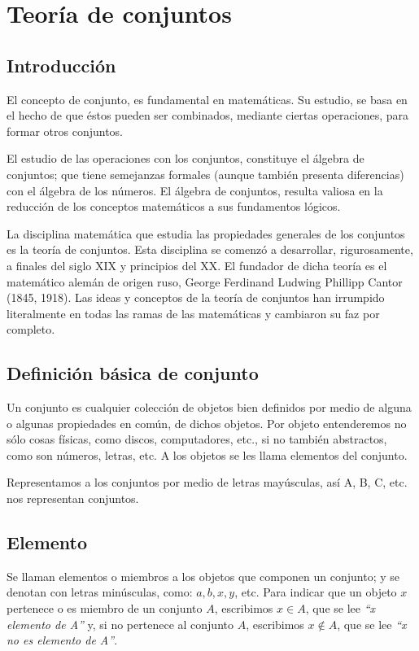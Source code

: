 \section{Teoría de conjuntos}

\subsection{Introducción}

El concepto de conjunto, es fundamental en matemáticas. Su estudio, se basa en
el hecho de que éstos pueden ser combinados, mediante ciertas operaciones, para
formar otros conjuntos. 

El estudio de las operaciones con los conjuntos, constituye el álgebra de
conjuntos; que tiene semejanzas formales (aunque también presenta diferencias)
con el álgebra de los números. El álgebra de conjuntos, resulta valiosa en la
reducción de los conceptos matemáticos a sus fundamentos lógicos. 

La disciplina matemática que estudia las propiedades generales de los conjuntos
es la teoría de conjuntos. Esta disciplina se comenzó a desarrollar,
rigurosamente, a finales del siglo XIX y principios del XX. El fundador de dicha
teoría es el matemático alemán de origen ruso, George Ferdinand Ludwing
Phillipp Cantor (1845, 1918). Las ideas y conceptos de la teoría de conjuntos
han irrumpido literalmente en todas las ramas de las matemáticas y cambiaron su
faz por completo.

\subsection{Definición básica de conjunto}

Un conjunto es cualquier colección de objetos bien definidos por medio de alguna
o algunas propiedades en común, de dichos objetos. Por objeto entenderemos no
sólo cosas físicas, como discos, computadores, etc., si no también abstractos,
como son números, letras, etc. A los objetos se les llama elementos del
conjunto.

Representamos a los conjuntos por medio de letras mayúsculas, así A, B, C, etc.
nos representan conjuntos.

\subsection{Elemento}

Se llaman elementos o miembros a los objetos que componen un conjunto; y se
denotan con letras minúsculas, como: $a, b, x, y$, etc. Para indicar que un
objeto $x$ pertenece o es miembro de un conjunto $A$, escribimos $x \in A$, que
se lee \textit{“x elemento de A”} y, si no pertenece al conjunto $A$, escribimos
$x \notin A$, que se lee \textit{“x no es elemento de A”}.

